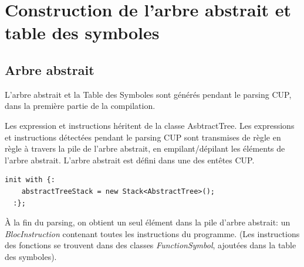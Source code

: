 \documentclass[11pt,a4paper]{article}
\begin{document}
   
   \section{Construction de l'arbre abstrait et table des symboles}
   
   \subsection{Arbre abstrait}
   
   \par L'arbre abstrait et la Table des Symboles sont générés pendant le parsing CUP, dans la première partie de la compilation. 
   
   \par Les expression et instructions héritent de la classe AsbtractTree. Les expressions et instructions détectées pendant le parsing CUP sont transmises de règle en règle à travers la pile de l'arbre abstrait, en empilant/dépilant les éléments de l'arbre abstrait. L'arbre abstrait est défini dans une des entêtes CUP.
   
   \begin{lstlisting}[caption={Déclaration de la pile de l'arbre abstrait}]
  init with {:
    abstractTreeStack = new Stack<AbstractTree>();
  :};
  \end{lstlisting}
  
  \par À la fin du parsing, on obtient un seul élément dans la pile d'arbre abstrait: un \textit{BlocInstruction} contenant toutes les instructions du programme. (Les instructions des fonctions se trouvent dans des classes \textit{FunctionSymbol}, ajoutées dans la table des symboles). 
  
\end{document}

